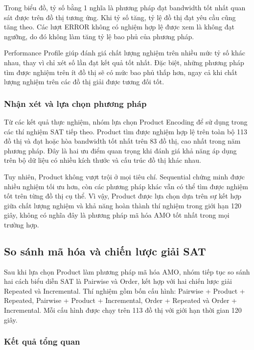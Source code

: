 \documentclass[a4paper,fleqn]{cas-sc}
\begin{document}
Trong biểu đồ, tỷ số bằng 1 nghĩa là phương pháp đạt bandwidth tốt nhất quan sát được trên đồ thị tương ứng. Khi tỷ số tăng, tỷ lệ đồ thị đạt yêu cầu cũng tăng theo. Các lượt ERROR không có nghiệm hợp lệ được xem là không đạt ngưỡng, do đó không làm tăng tỷ lệ bao phủ của phương pháp.

Performance Profile giúp đánh giá chất lượng nghiệm trên nhiều mức tỷ số khác nhau, thay vì chỉ xét số lần đạt kết quả tốt nhất. Đặc biệt, những phương pháp tìm được nghiệm trên ít đồ thị sẽ có mức bao phủ thấp hơn, ngay cả khi chất lượng nghiệm trên các đồ thị giải được tương đối tốt.

\subsubsection{Nhận xét và lựa chọn phương pháp}

Từ các kết quả thực nghiệm, nhóm lựa chọn Product Encoding để sử dụng trong các thí nghiệm SAT tiếp theo. Product tìm được nghiệm hợp lệ trên toàn bộ 113 đồ thị và đạt hoặc hòa bandwidth tốt nhất trên 83 đồ thị, cao nhất trong năm phương pháp. Đây là hai ưu điểm quan trọng khi đánh giá khả năng áp dụng trên bộ dữ liệu có nhiều kích thước và cấu trúc đồ thị khác nhau.

Tuy nhiên, Product không vượt trội ở mọi tiêu chí. Sequential chứng minh được nhiều nghiệm tối ưu hơn, còn các phương pháp khác vẫn có thể tìm được nghiệm tốt trên từng đồ thị cụ thể. Vì vậy, Product được lựa chọn dựa trên sự kết hợp giữa chất lượng nghiệm và khả năng hoàn thành thí nghiệm trong giới hạn 120 giây, không có nghĩa đây là phương pháp mã hóa AMO tốt nhất trong mọi trường hợp.

\FloatBarrier



\subsection{So sánh mã hóa và chiến lược giải SAT}

Sau khi lựa chọn Product làm phương pháp mã hóa AMO, nhóm tiếp tục so sánh hai cách biểu diễn SAT là Pairwise và Order, kết hợp với hai chiến lược giải Repeated và Incremental. Thí nghiệm gồm bốn cấu hình: Pairwise + Product + Repeated, Pairwise + Product + Incremental, Order + Repeated và Order + Incremental. Mỗi cấu hình được chạy trên 113 đồ thị với giới hạn thời gian 120 giây.

\subsubsection{Kết quả tổng quan}
\end{document}
